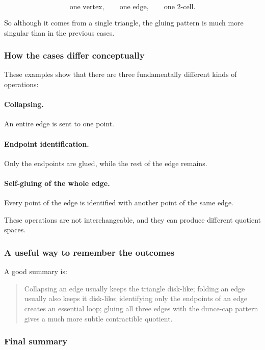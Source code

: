 \documentclass[12pt,a4paper]{article}
\theoremstyle{notespace}
\begin{document}
\[
\text{one vertex},\qquad
\text{one edge},\qquad
\text{one 2-cell}.
\]

So although it comes from a single triangle, the gluing pattern is much more singular than in the previous cases.

\subsubsection{How the cases differ conceptually}

These examples show that there are three fundamentally different kinds of operations:

\paragraph{Collapsing.}
An entire edge is sent to one point.

\paragraph{Endpoint identification.}
Only the endpoints are glued, while the rest of the edge remains.

\paragraph{Self-gluing of the whole edge.}
Every point of the edge is identified with another point of the same edge.

These operations are not interchangeable, and they can produce different quotient spaces.

\subsubsection{A useful way to remember the outcomes}

A good summary is:

\begin{quote}
	Collapsing an edge usually keeps the triangle disk-like; folding an edge usually also keeps it disk-like; identifying only the endpoints of an edge creates an essential loop; gluing all three edges with the dunce-cap pattern gives a much more subtle contractible quotient.
\end{quote}

\subsubsection{Final summary}
\end{document}
